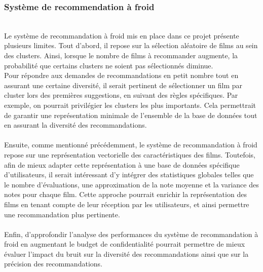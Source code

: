 \documentclass{article}
\begin{document}
\subsubsection{Système de recommendation à froid}
$ $\\
Le système de recommandation à froid mis en place dans ce projet présente plusieurs limites.
Tout d’abord, il repose sur la sélection aléatoire de films au sein des clusters. Ainsi, lorsque
le nombre de films à recommander augmente, la probabilité que certains clusters ne soient pas sélectionnés diminue.\\
Pour répondre aux demandes de recommandations en petit nombre tout en assurant une certaine diversité, il serait pertinent
de sélectionner un film par cluster lors des premières suggestions, en suivant des règles spécifiques. Par exemple, on
pourrait privilégier les clusters les plus importants. Cela permettrait de garantir une représentation minimale de l’ensemble
de la base de données tout en assurant la diversité des recommandations.\\
\\
Ensuite, comme mentionné précédemment, le système de recommandation à froid repose sur une représentation
vectorielle des caractéristiques des films. Toutefois, afin de mieux adapter cette représentation
à une base de données spécifique d’utilisateurs, il serait intéressant d’y intégrer des
statistiques globales telles que le nombre d’évaluations, une approximation de la note moyenne
et la variance des notes pour chaque film. Cette approche pourrait enrichir la représentation
des films en tenant compte de leur réception par les utilisateurs, et ainsi permettre une recommandation plus pertinente.\\
\\
Enfin, d'approfondir l'analyse des performances du système de recommandation à froid en augmentant le budget de confidentialité
pourrait permettre de mieux évaluer l'impact du bruit sur la diversité des recommandations ainsi que sur la précision des recommandations.
\end{document}
